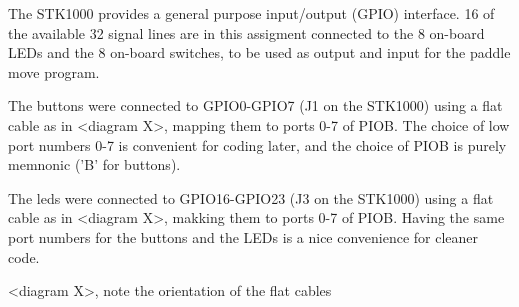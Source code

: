 The STK1000 provides a general purpose input/output (GPIO) interface.
16 of the available 32 signal lines are in this assigment connected to the 8 on-board LEDs and the 8 on-board switches, to be used as output and input for the paddle move program.

The buttons were connected to GPIO0-GPIO7 (J1 on the STK1000) using a flat cable as in <diagram X>, mapping them to ports 0-7 of PIOB.
The choice of low port numbers 0-7 is convenient for coding later, and the choice of PIOB is purely memnonic ('B' for buttons).

The leds were connected to GPIO16-GPIO23 (J3 on the STK1000) using a flat cable as in <diagram X>, makking them to ports 0-7 of PIOB.
Having the same port numbers for the buttons and the LEDs is a nice convenience for cleaner code.


<diagram X>, note the orientation of the flat cables
